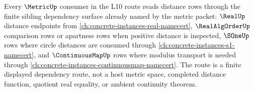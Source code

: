 \begin{lemma}
\label{thm:metric-l10-sibling-dependency-route}
Every $\MetricUp$ consumer in the L10 route reads distance rows through the finite sibling dependency surface already named by the metric packet: $\RealUp$ distance endpoints from \autoref{ch:concrete-instances-real-namecert}, $\RealAlgOrderUp$ comparison rows or apartness rows when positive distance is inspected, $\SOneUp$ rows where circle distances are consumed through \autoref{ch:concrete-instances-s1-namecert}, and $\ContinuousMapUp$ rows where modulus transport is needed through \autoref{ch:concrete-instances-continuousmap-namecert}. The route is a finite displayed dependency route, not a host metric space, completed distance function, quotient real equality, or ambient continuity theorem.
\end{lemma}
